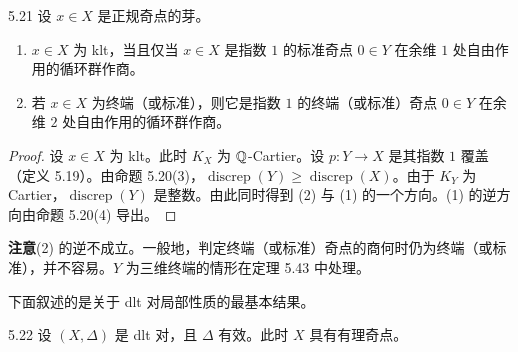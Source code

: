 
\begin{corollaryp}{5.21}
设 $x\in X$ 是正规奇点的芽。
\begin{enumerate}[label=(\arabic*),leftmargin=*]
\item $x\in X$ 为 klt，当且仅当 $x\in X$ 是指数 $1$ 的标准奇点 $0\in Y$ 在余维 $1$ 处自由作用的循环群作商。
\item 若 $x\in X$ 为终端（或标准），则它是指数 $1$ 的终端（或标准）奇点 $0\in Y$ 在余维 $2$ 处自由作用的循环群作商。
\end{enumerate}
\end{corollaryp}

\begin{proof}
设 $x\in X$ 为 klt。此时 $K_X$ 为 $\mathbb{Q}$-Cartier。设 $p\colon Y\to X$ 是其指数 $1$ 覆盖（定义 5.19）。由命题 5.20(3)，$\operatorname{discrep}(Y)\ge\operatorname{discrep}(X)$。由于 $K_Y$ 为 Cartier，$\operatorname{discrep}(Y)$ 是整数。由此同时得到 (2) 与 (1) 的一个方向。(1) 的逆方向由命题 5.20(4) 导出。
\end{proof}

\par\medskip\noindent\textbf{注意}\quad (2) 的逆不成立。一般地，判定终端（或标准）奇点的商何时仍为终端（或标准），并不容易。$Y$ 为三维终端的情形在定理 5.43 中处理。

下面叙述的是关于 dlt 对局部性质的最基本结果。

\begin{theoremp}{5.22}
设 $(X,\Delta)$ 是 dlt 对，且 $\Delta$ 有效。此时 $X$ 具有有理奇点。
\end{theoremp}

